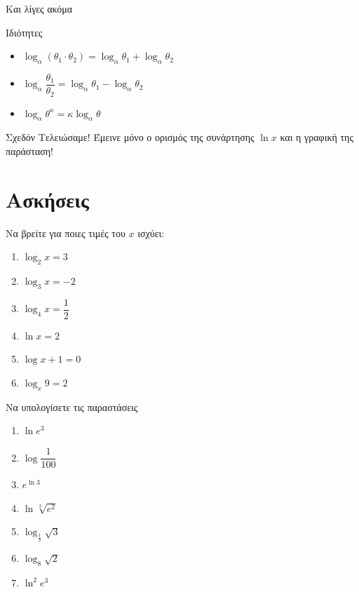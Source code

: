\documentclass{presentation}
\begin{document}
\begin{frame}[label=Ιδιότητες]{Και λίγες ακόμα}
  \begin{block}{Ιδιότητες}
    \begin{itemize}
      \item<1-> $\log_α\left( θ_1\cdot θ_2 \right)=\log_αθ_1+\log_αθ_2 $
      \item<2-> $\log_α\dfrac{θ_1}{θ_2}=\log_αθ_1-\log_αθ_2 $
      \item<3-> $\log_αθ^κ=κ\log_αθ$
    \end{itemize}
  \end{block}
  \hyperlink{Απόδειξη1}{}
\end{frame}

\begin{frame}{Σχεδόν Τελειώσαμε!}
  Έμεινε μόνο ο ορισμός της συνάρτησης $\ln x$ και η γραφική της παράσταση!
\end{frame}

\section{Ασκήσεις}
\begin{askisi}
  Να βρείτε για ποιες τιμές του $x$ ισχύει:
  \begin{enumerate}
    \item<1-> $\log_2x=3$
    \item<2-> $\log_3x=-2$
    \item<3-> $\log_4x=\dfrac{1}{2}$
    \item<4-> $\ln x=2$
    \item<5-> $\log x+1=0$
    \item<6-> $\log_x9=2$
  \end{enumerate}


\end{askisi}

\begin{askisi}
  Να υπολογίσετε τις παραστάσεις
  \begin{enumerate}
    \item<1-> $\ln e^3$
    \item<2-> $\log\dfrac{1}{100}$
    \item<3-> $e^{\ln 3}$
    \item<4-> $\ln \sqrt[3]{e^2}$
    \item<5-> $\log_{\frac{1}{3}}\sqrt{3}$
    \item<6-> $\log_8\sqrt{2}$
    \item<7-> $\ln^2e^3$
  \end{enumerate}

  \hyperlink{Θεωρία1}{}

\end{askisi}
\end{document}
